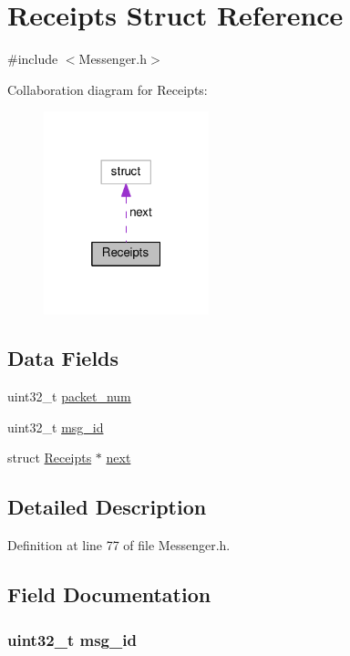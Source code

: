 \hypertarget{struct_receipts}{\section{Receipts Struct Reference}
\label{struct_receipts}
}


{\ttfamily \#include $<$Messenger.\+h$>$}



Collaboration diagram for Receipts\+:
\nopagebreak
\begin{figure}[H]
\begin{center}
\leavevmode
\includegraphics[width=136pt]{de/d50/struct_receipts__coll__graph}
\end{center}
\end{figure}
\subsection*{Data Fields}
\begin{DoxyCompactItemize}
\item 
uint32\+\_\+t \hyperlink{struct_receipts_a3110fa374a202ca37de05e1bb9c95f17}{packet\+\_\+num}
\item 
uint32\+\_\+t \hyperlink{struct_receipts_a8d62bc717240dc62a7c3595d7b2a75ff}{msg\+\_\+id}
\item 
struct \hyperlink{struct_receipts}{Receipts} $\ast$ \hyperlink{struct_receipts_a4cf1c9c7aa66ba420c540e3070555c89}{next}
\end{DoxyCompactItemize}


\subsection{Detailed Description}


Definition at line 77 of file Messenger.\+h.



\subsection{Field Documentation}
\hypertarget{struct_receipts_a8d62bc717240dc62a7c3595d7b2a75ff}{
\subsubsection[{msg\+\_\+id}]{\setlength{\rightskip}{0pt plus 5cm}uint32\+\_\+t msg\+\_\+id}}\label{struct_receipts_a8d62bc717240dc62a7c3595d7b2a75ff}


